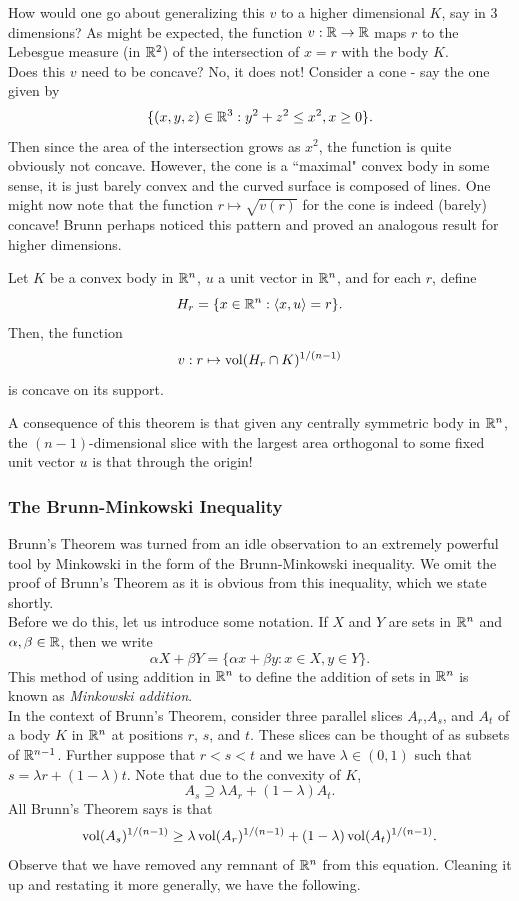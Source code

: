 How would one go about generalizing this $v$ to a higher dimensional $K$, say in $3$ dimensions? As might be expected, the function $v:\mathbb{R}\to\mathbb{R}$ maps $r$ to the Lebesgue measure (in $\mathbb{R}^2$) of the intersection of $x=r$ with the body $K$.\\
Does this $v$ need to be concave? No, it does not! Consider a cone - say the one given by
\[\{(x,y,z)\in\mathbb{R}^3 : y^2+z^2\leq x^2, x\geq 0\}.\]
Then since the area of the intersection grows as $x^2$, the function is quite obviously not concave. However, the cone is a ``maximal" convex body in some sense, it is just barely convex and the curved surface is composed of lines. One might now note that the function $r\mapsto \sqrt{v(r)}$ for the cone is indeed (barely) concave! Brunn perhaps noticed this pattern and proved an analogous result for higher dimensions.

\begin{ftheo}
Let $K$ be a convex body in $\mathbb{R}^n$, $u$ a unit vector in $\mathbb{R}^n$, and for each $r$, define
\[ H_r = \{x\in\mathbb{R}^n : \langle x,u\rangle = r\}. \]
Then, the function
\[ v:r\mapsto \operatorname{vol}(H_r\cap K)^{1/(n-1)} \]
is concave on its support.
\end{ftheo}

A consequence of this theorem is that given any centrally symmetric body in $\mathbb{R}^n$, the $(n-1)$-dimensional slice with the largest area orthogonal to some fixed unit vector $u$ is that through the origin!

\subsubsection{The Brunn-Minkowski Inequality}

Brunn's Theorem was turned from an idle observation to an extremely powerful tool by Minkowski in the form of the Brunn-Minkowski inequality. We omit the proof of Brunn's Theorem as it is obvious from this inequality, which we state shortly.\\

Before we do this, let us introduce some notation. If $X$ and $Y$ are sets in $\mathbb{R}^n$ and $\alpha,\beta\in\mathbb{R}$, then we write
\[ \alpha X + \beta Y = \{ \alpha x + \beta y : x \in X, y \in Y \}. \]
This method of using addition in $\mathbb{R}^n$ to define the addition of sets in $\mathbb{R}^n$ is known as \textit{Minkowski addition}.\\
In the context of Brunn's Theorem, consider three parallel slices $A_r$,$A_s$, and $A_t$ of a body $K$ in $\mathbb{R}^n$ at positions $r$, $s$, and $t$. These slices can be thought of as subsets of $\mathbb{R}^{n-1}$. Further suppose that $r<s<t$ and we have $\lambda\in(0,1)$ such that $s = \lambda r + (1-\lambda)t$. Note that due to the convexity of $K$, 
\[A_s \supseteq \lambda A_r + (1-\lambda)A_t.\]
All Brunn's Theorem says is that
\[ \operatorname{vol}(A_s)^{1/(n-1)} \geq \lambda \operatorname{vol}(A_r)^{1/(n-1)} + (1-\lambda) \operatorname{vol}(A_t)^{1/(n-1)}. \]
Observe that we have removed any remnant of $\mathbb{R}^n$ from this equation. Cleaning it up and restating it more generally, we have the following.

